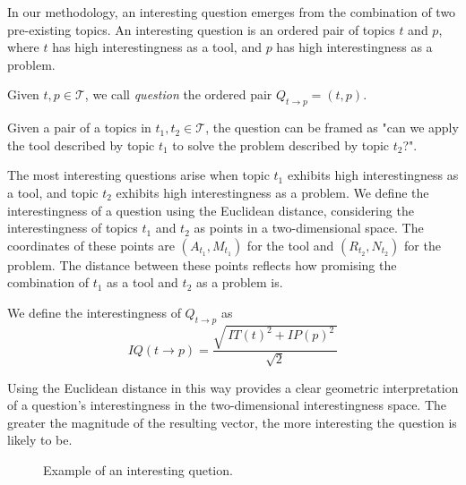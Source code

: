 In our methodology, an interesting question emerges from the combination of two pre-existing topics. An interesting question is an ordered pair of topics $t$ and $p$, where $t$ has high interestingness as a tool, and $p$ has high interestingness as a problem.

\begin{definition}
Given $t, p\in\mathcal{T}$, we call \emph{question} the ordered pair $Q_{t\to p}=(t,p)$.
\end{definition}

Given a pair of a topics in $t_1, t_2 \in \mathcal{T}$, the question can be framed as "can we apply the tool described by topic $t_1$ to solve the problem described by topic $t_2$?".

The most interesting questions arise when topic $t_1$ exhibits high interestingness as a tool, and topic $t_2$ exhibits high interestingness as a problem. We define the interestingness of a question using the Euclidean distance, considering the interestingness of topics $t_1$ and $t_2$ as points in a two-dimensional space. The coordinates of these points are $(A_{t_1}, M_{t_1})$ for the tool and $(R_{t_2}, N_{t_2})$ for the problem. The distance between these points reflects how promising the combination of $t_1$ as a tool and $t_2$ as a problem is.

\begin{definition}
We define the interestingness of $Q_{t\to p}$ as
\[
IQ(t\to p)=\frac{\sqrt{\,IT(t)^2+IP(p)^2\,}}{\sqrt{2}}
\]
\end{definition}

Using the Euclidean distance in this way provides a clear geometric interpretation of a question's interestingness in the two-dimensional interestingness space. The greater the magnitude of the resulting vector, the more interesting the question is likely to be.

\begin{figure}[t]
\centering
{}
\caption{\label{fig:InterestingQuestion}Example of an interesting quetion.}
\end{figure}

